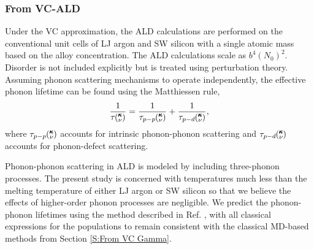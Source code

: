 
\subsubsection{\label{S:From VC-ALD}From VC-ALD}

Under the VC approximation, the 
ALD calculations\cite{turney_predicting_2009-1} are performed on the 
conventional unit cells of LJ argon and SW silicon with a single  
atomic mass based on the alloy concentration. The ALD calculations scale 
as $b^4(N_{0})^2$.\cite{turney_predicting_2009} Disorder is not included 
explicitly but is treated using perturbation theory. 
Assuming phonon scattering mechanisms 
to operate independently, the 
effective phonon lifetime can be found using the Matthiessen rule,
\cite{ziman_electrons_2001} 
\begin{equation}\label{EQ:Matthiessen}
\frac{1}{\tau\kv} = \frac{1}{\tau_{p-p}\kv} + \frac{1}{\tau_{p-d}\kv},
\end{equation}
where $\tau_{p-p}\mspace{-4.0mu}\left(\mspace{-8.0mu} \begin{smallmatrix}&\pmb{\kappa} \\&\nu\end{smallmatrix} \mspace{-3.0mu}\right)$ accounts for intrinsic phonon-phonon scattering 
and $\tau_{p-d}\mspace{-4.0mu}\left(\mspace{-8.0mu} \begin{smallmatrix}&\pmb{\kappa} \\&\nu\end{smallmatrix} \mspace{-3.0mu}\right)$ accounts for phonon-defect scattering.

Phonon-phonon scattering in ALD is modeled by including three-phonon 
processes.\cite{turney_predicting_2009-1,garg_role_2011,tian_phonon_2012} 
The present study is concerned with temperatures much less than the 
melting temperature of either LJ argon
\cite{mcgaughey_phonon_2004} or 
SW silicon\cite{stillinger_computer_1985} so that we believe the effects 
of higher-order phonon processes are 
negligible.\cite{ecsedy_thermal_1977,turney_predicting_2009-1} 
We predict the phonon-phonon lifetimes using the method 
described in Ref. , 
with all classical expressions for the populations to remain 
consistent with the classical MD-based methods from 
Section \ref{S:From VC Gamma}. 

